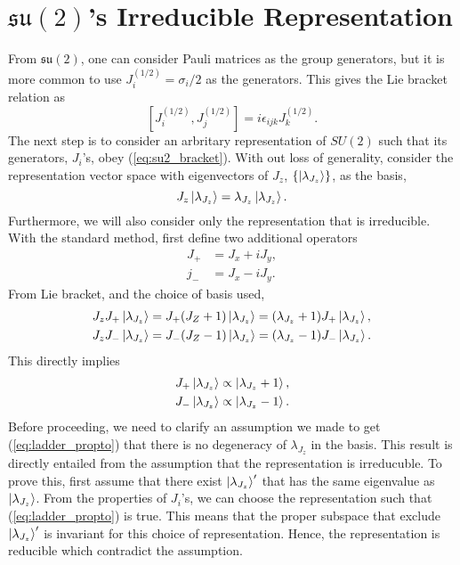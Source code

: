 \documentclass[12pt]{revtex4-2}
\begin{document}
\section{$\mathfrak{su(2)}$'s Irreducible Representation}
From $\mathfrak{su(2)}$, one can consider Pauli matrices as the group generators, but it is more common to use $J^{(1/2)}_i = \sigma_i/2$ as the generators. This gives the Lie bracket relation as
\begin{equation} \label{eq:su2_bracket}
    \left[J^{(1/2)}_i, J^{(1/2)}_j\right] = i\epsilon_{ijk}J^{(1/2)}_k.
\end{equation}
The next step is to consider an arbritary representation of $SU(2)$ such that its generators, $J_i$'s, obey (\ref{eq:su2_bracket}). With out loss of generality, consider the representation vector space with eigenvectors of $J_z$, $\{\ket{\lambda_{J_z}}\}$, as the basis,
\begin{equation}
    J_z\ket{\lambda_{J_z}}=\lambda_{J_z}\ket{\lambda_{J_z}}.
\end{equation}
Furthermore, we will also consider only the representation that is irreducible. With the standard method, first define two additional operators
\begin{equation}
    \begin{aligned}
        J_+ &= J_x + iJ_y, \\
        j_- &= J_x - iJ_y.
    \end{aligned}
\end{equation}
From Lie bracket, and the choice of basis used,
\begin{equation}
    \begin{aligned}
        J_zJ_+\ket{\lambda_{J_z}} &= J_+(J_Z+1)\ket{\lambda_{J_z}} = (\lambda_{J_z}+1)J_+\ket{\lambda_{J_z}}, \\
        J_zJ_-\ket{\lambda_{J_z}} &= J_-(J_Z-1)\ket{\lambda_{J_z}} = (\lambda_{J_z}-1)J_-\ket{\lambda_{J_z}}.
    \end{aligned}
\end{equation}
This directly implies
\begin{equation} \label{eq:ladder_propto}
    \begin{aligned}
        J_+\ket{\lambda_{J_z}} &\propto \ket{\lambda_{J_z}+1}, \\
        J_-\ket{\lambda_{J_z}} &\propto \ket{\lambda_{J_z}-1}.
    \end{aligned}
\end{equation}
Before proceeding, we need to clarify an assumption we made to get (\ref{eq:ladder_propto}) that there is no degeneracy of $\lambda_{J_z}$ in the basis. This result is directly entailed from the assumption that the representation is irreducuble. To prove this, first assume that there exist $\ket{\lambda_{J_z}}'$ that has the same eigenvalue as $\ket{\lambda_{J_z}}$. From the properties of $J_i$'s, we can choose the representation such that (\ref{eq:ladder_propto}) is true. This means that the proper subspace that exclude $\ket{\lambda_{J_z}}'$ is invariant for this choice of representation. Hence, the representation is reducible which contradict the assumption.
\end{document}
